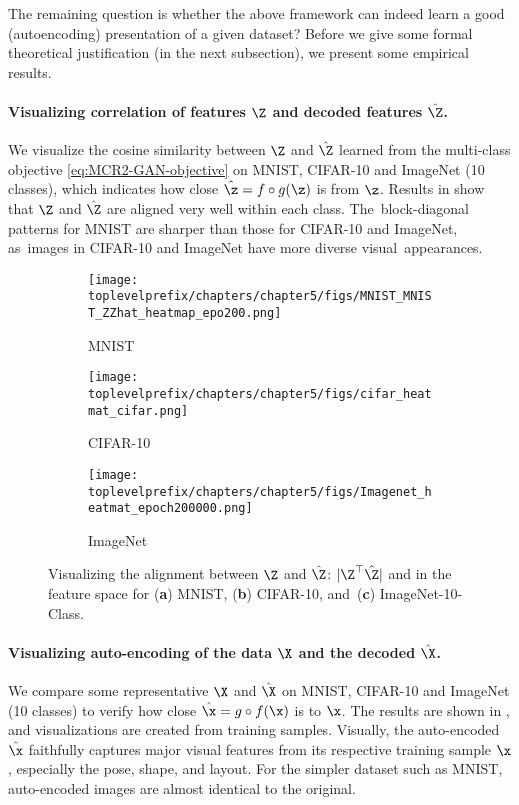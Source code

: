 \documentclass[../../book-main.tex]{subfiles}
\begin{document}
The remaining question is whether the above framework can indeed learn a good (autoencoding) presentation of a given dataset? Before we give some formal theoretical justification (in the next subsection), we present some empirical results. 

\paragraph{Visualizing correlation of features $\Z$ and decoded features $\hat \Z$.} We visualize the cosine similarity between $\Z$ and $\hat{\Z}$ learned from the multi-class objective \eqref{eq:MCR2-GAN-objective} on MNIST, CIFAR-10 and ImageNet (10 classes), which indicates how close $\hat{\z} = f\circ g(\z)$ is from $\z$. Results in  show that $\Z$ and $\hat{\Z}$ are aligned very well within each class. The~block-diagonal patterns for MNIST are sharper than those for CIFAR-10 and ImageNet, as~images in CIFAR-10 and ImageNet have more diverse visual~appearances.

\begin{figure}[t]
    \begin{subfigure}[t]{0.3\textwidth}
        \centering
        \texttt{[image: \\toplevelprefix/chapters/chapter5/figs/MNIST\_MNIST\_ZZhat\_heatmap\_epo200.png]}
        \caption{MNIST}
    \end{subfigure}
    \hfill
    \begin{subfigure}[t]{0.3\textwidth}
        \centering
        \texttt{[image: \\toplevelprefix/chapters/chapter5/figs/cifar\_heatmat\_cifar.png]}
        \caption{CIFAR-10}
    \end{subfigure}
    \hfill
    \begin{subfigure}[t]{0.3\textwidth}
        \centering
        \texttt{[image: \\toplevelprefix/chapters/chapter5/figs/Imagenet\_heatmat\_epoch200000.png]}
        \caption{ImageNet}
    \end{subfigure}
    \caption{{Visualizing} %
    the alignment between $\Z$ and $\hat{\Z}$: $|\Z^\top \hat{\Z}|$ and  in the feature space for (\textbf{a}) MNIST, (\textbf{b}) CIFAR-10, and~(\textbf{c}) ImageNet-10-Class.}
    \label{fig:justifyz=z}
\end{figure}
 





\paragraph{Visualizing auto-encoding of the data $\X$ and the decoded $\hat \X$.} We compare some representative $\X$ and $\hat{\X}$ on MNIST, CIFAR-10 and ImageNet (10 classes) to verify how close $\hat \x = g\circ f(\x)$ is to $\x$. The results are shown in , and visualizations are created from training samples. Visually, the auto-encoded $\hat \x$ faithfully captures major visual features from its respective training sample $\x$, especially the pose, shape, and layout. For the simpler dataset such as MNIST, auto-encoded images are almost identical to the original. %
\end{document}

